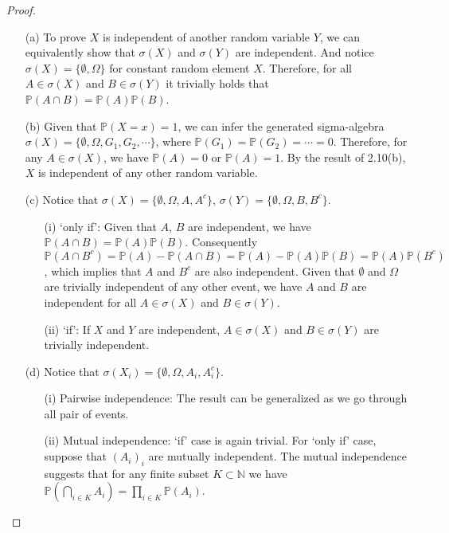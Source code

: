 \begin{proof}

\begin{enumerate}
    \item[(a)] To prove $X$ is independent of another random variable $Y$,
    we can equivalently show that $\sigma(X)$ and $\sigma(Y)$ are independent.
    And notice $\sigma(X) = \{\emptyset, \Omega\}$ for constant random element $X$.
    Therefore, for all $A \in \sigma(X)$ and $B \in \sigma(Y)$ it trivially holds that $\mathbb{P}(A \cap B) = \mathbb{P}(A) \mathbb{P}(B)$.

    \item[(b)] Given that $\mathbb{P}(X = x) = 1$, we can infer the generated sigma-algebra $\sigma(X) = \{\emptyset, \Omega, G_1, G_2, \cdots\}$,
    where $\mathbb{P}(G_1) = \mathbb{P}(G_2) = \cdots = 0$.
    Therefore, for any $A \in \sigma(X)$, we have $\mathbb{P}(A) = 0$ or $\mathbb{P}(A) = 1$.
    By the result of 2.10(b), $X$ is independent of any other random variable.

    \item[(c)] Notice that $\sigma(X) = \{\emptyset, \Omega, A, A^c\}$, $\sigma(Y) = \{\emptyset, \Omega, B, B^c\}$.
    \begin{enumerate}
        \item[(i)] `only if': Given that $A$, $B$ are independent, we have $\mathbb{P}(A \cap B) = \mathbb{P}(A) \mathbb{P}(B)$.
        Consequently $\mathbb{P}(A \cap B^c) = \mathbb{P}(A) - \mathbb{P}(A \cap B) = \mathbb{P}(A) - \mathbb{P}(A) \mathbb{P}(B) = \mathbb{P}(A) \mathbb{P}(B^c)$,
        which implies that $A$ and $B^c$ are also independent.
        Given that $\emptyset$ and $\Omega$ are trivially independent of any other event, we have $A$ and $B$ are independent for all $A \in \sigma(X)$ and $B \in \sigma(Y)$.
        \item[(ii)] `if': If $X$ and $Y$ are independent, $A \in \sigma(X)$ and $B \in \sigma(Y)$ are trivially independent.
    \end{enumerate}

    \item[(d)] Notice that $\sigma(X_i) = \{\emptyset, \Omega, A_i, A_i^c\}$.
    \begin{enumerate}
        \item[(i)] Pairwise independence: The result can be generalized as we go through all pair of events.
        \item[(ii)] Mutual independence: `if' case is again trivial. For `only if' case, suppose that $(A_i)_i$ are mutually independent.
        The mutual independence suggests that for any finite subset $K \subset \mathbb{N}$ we have$\mathbb{P}\left(\bigcap_{i \in K} A_{i}\right)=\prod_{i \in K} \mathbb{P}\left(A_{i}\right)$.


\end{enumerate}
\end{enumerate}
\end{proof}
